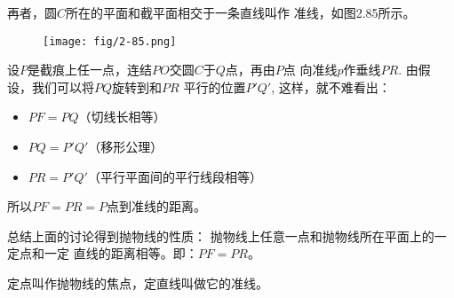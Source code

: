 再者，圆$C$所在的平面和截平面相交于一条直线叫作
准线，如图2.85所示。
\begin{figure}[htp]
    \centering
    \texttt{[image: fig/2-85.png]}
    \caption{}
\end{figure}

设$P$是截痕上任一点，连结$PO$交圆$C$于$Q$点，再由$P$点
向准线$p$作垂线$PR$. 由假设，我们可以将$PQ$旋转到和$PR$
平行的位置$P'Q'$, 这样，就不难看出：
\begin{itemize}
    \item $PF=PQ$（切线长相等）
    \item $PQ=P'Q'$（移形公理）
    \item $PR=P'Q'$（平行平面间的平行线段相等）
\end{itemize}

所以$PF=PR=P$点到准线的距离。

总结上面的讨论得到抛物线的性质：
抛物线上任意一点和抛物线所在平面上的一定点和一定
直线的距离相等。即：$PF=PR$。

定点叫作抛物线的焦点，定直线叫做它的准线。

